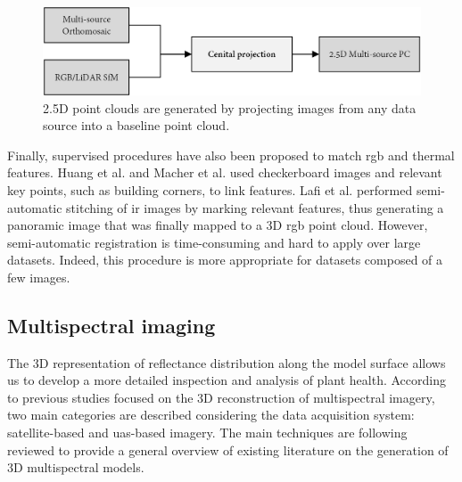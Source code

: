 \begin{figure}[ht]
	\includegraphics[width=\linewidth]{figs/context/fusion_02.png}
	\caption{2.5D point clouds are generated by projecting images from any data source into a baseline point cloud.}
    \label{fig:fusion_data_02}
\end{figure}

Finally, supervised procedures have also been proposed to match \acrshort{rgb} and thermal features. Huang et al. and Macher et al. \cite{huang_combining_2018, macher_combination_2019} used checkerboard images and relevant key points, such as building corners, to link features. Lafi et al. \cite{lafi_3d_2017} performed semi-automatic stitching of \acrshort{ir} images by marking relevant features, thus generating a panoramic image that was finally mapped to a 3D \acrshort{rgb} point cloud. However, semi-automatic registration is time-consuming and hard to apply over large datasets. Indeed, this procedure is more appropriate for datasets composed of a few images.

\subsection{Multispectral imaging}

The 3D representation of reflectance distribution along the model surface allows us to develop a more detailed inspection and analysis of plant health. According to previous studies focused on the 3D reconstruction of multispectral imagery, two main categories are described considering the data acquisition system: satellite-based and \acrshort{uas}-based imagery. The main techniques are following reviewed to provide a general overview of existing literature on the generation of 3D multispectral models.

